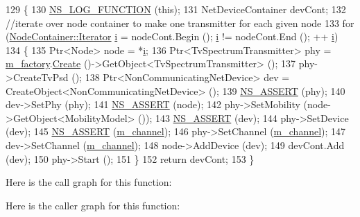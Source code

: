\begin{DoxyCode}
129 \{
130   \hyperlink{log-macros-disabled_8h_a90b90d5bad1f39cb1b64923ea94c0761}{NS\_LOG\_FUNCTION} (\textcolor{keyword}{this});
131   NetDeviceContainer devCont;
132   \textcolor{comment}{//iterate over node container to make one transmitter for each given node}
133   \textcolor{keywordflow}{for} (\hyperlink{classns3_1_1NodeContainer_aa1a9f2d2b09bfef7d066d3974bca2cc4}{NodeContainer::Iterator} \hyperlink{bernuolliDistribution_8m_a6f6ccfcf58b31cb6412107d9d5281426}{i} = nodeCont.Begin (); \hyperlink{bernuolliDistribution_8m_a6f6ccfcf58b31cb6412107d9d5281426}{i} != nodeCont.End (); ++
      \hyperlink{bernuolliDistribution_8m_a6f6ccfcf58b31cb6412107d9d5281426}{i})
134     \{
135       Ptr<Node> node = *\hyperlink{bernuolliDistribution_8m_a6f6ccfcf58b31cb6412107d9d5281426}{i};
136       Ptr<TvSpectrumTransmitter> phy = \hyperlink{classns3_1_1TvSpectrumTransmitterHelper_ae89194664bc52ed899f7dd0d074e588c}{m\_factory}.\hyperlink{classns3_1_1ObjectFactory_a18152e93f0a6fe184ed7300cb31e9896}{Create} ()->GetObject<TvSpectrumTransmitter>
       ();
137       phy->CreateTvPsd ();
138       Ptr<NonCommunicatingNetDevice> dev = CreateObject<NonCommunicatingNetDevice> ();
139       \hyperlink{assert_8h_a6dccdb0de9b252f60088ce281c49d052}{NS\_ASSERT} (phy);
140       dev->SetPhy (phy);
141       \hyperlink{assert_8h_a6dccdb0de9b252f60088ce281c49d052}{NS\_ASSERT} (node);
142       phy->SetMobility (node->GetObject<MobilityModel> ());
143       \hyperlink{assert_8h_a6dccdb0de9b252f60088ce281c49d052}{NS\_ASSERT} (dev);
144       phy->SetDevice (dev);
145       \hyperlink{assert_8h_a6dccdb0de9b252f60088ce281c49d052}{NS\_ASSERT} (\hyperlink{classns3_1_1TvSpectrumTransmitterHelper_afc92164bf4a2a99985189207ee3a53a8}{m\_channel});
146       phy->SetChannel (\hyperlink{classns3_1_1TvSpectrumTransmitterHelper_afc92164bf4a2a99985189207ee3a53a8}{m\_channel});
147       dev->SetChannel (\hyperlink{classns3_1_1TvSpectrumTransmitterHelper_afc92164bf4a2a99985189207ee3a53a8}{m\_channel});
148       node->AddDevice (dev);
149       devCont.Add (dev);
150       phy->Start ();
151     \}
152   \textcolor{keywordflow}{return} devCont;
153 \}
\end{DoxyCode}


Here is the call graph for this function\+:




Here is the caller graph for this function\+:


